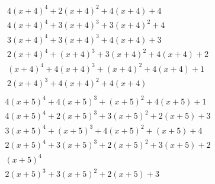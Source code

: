 \documentclass[bibliography=totoc, a4paper, 12pt]{extarticle}
\begin{document}
$$\begin{array}{l}
4(x+4)^4 + 2(x+4)^2 + 4(x+4) + 4\\
4(x+4)^4 + 3(x+4)^3 + 3(x+4)^2 + 4\\
3(x+4)^4 + 3(x+4)^3 + 4(x+4) + 3\\
2(x+4)^4 + (x+4)^3 + 3(x+4)^2 + 4(x+4) + 2\\
(x+4)^4 + 4(x+4)^3 + (x+4)^2 + 4(x+4) + 1\\
2(x+4)^3 + 4(x+4)^2 + 4(x+4)\\
\end{array}$$
$$\begin{array}{l}
4(x+5)^4 + 4(x+5)^3 + (x+5)^2 + 4(x+5) + 1\\
4(x+5)^4 + 2(x+5)^3 + 3(x+5)^2 + 2(x+5) + 3\\
3(x+5)^4 + (x+5)^3 + 4(x+5)^2 + (x+5) + 4\\
2(x+5)^4 + 3(x+5)^3 + 2(x+5)^2 + 3(x+5) + 2\\
(x+5)^4\\
2(x+5)^3 + 3(x+5)^2 + 2(x+5) + 3\\
\end{array}$$
\end{document}
